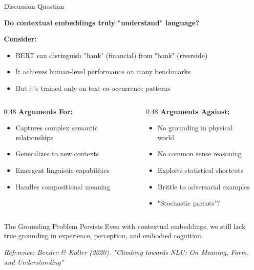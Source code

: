 \documentclass[aspectratio=169]{beamer}
\begin{document}
\begin{frame}[shrink=10]{Discussion Question 💬}
\begin{center}
\Large
\textbf{Do contextual embeddings truly "understand" language?}
\end{center}

\vspace{1em}

\textbf{Consider:}
\begin{itemize}\setlength{\itemsep}{0pt}
    \item BERT can distinguish "bank" (financial) from "bank" (riverside)
    \item It achieves human-level performance on many benchmarks
    \item But it's trained only on text co-occurrence patterns
\end{itemize}

\vspace{1em}

\begin{columns}[T]
\begin{column}{0.48\textwidth}
\textbf{Arguments For:}
\begin{itemize}\setlength{\itemsep}{0pt}
    \item Captures complex semantic relationships
    \item Generalizes to new contexts
    \item Emergent linguistic capabilities
    \item Handles compositional meaning
\end{itemize}
\end{column}

\begin{column}{0.48\textwidth}
\textbf{Arguments Against:}
\begin{itemize}\setlength{\itemsep}{0pt}
    \item No grounding in physical world
    \item No common sense reasoning
    \item Exploits statistical shortcuts
    \item Brittle to adversarial examples
    \item "Stochastic parrots"?
\end{itemize}
\end{column}
\end{columns}

\vspace{1em}

\begin{alertblock}{The Grounding Problem Persists}
Even with contextual embeddings, we still lack true grounding in experience, perception, and embodied cognition.
\end{alertblock}

\small
\textit{Reference: Bender \& Koller (2020). "Climbing towards NLU: On Meaning, Form, and Understanding"}
\end{frame}
\end{document}
